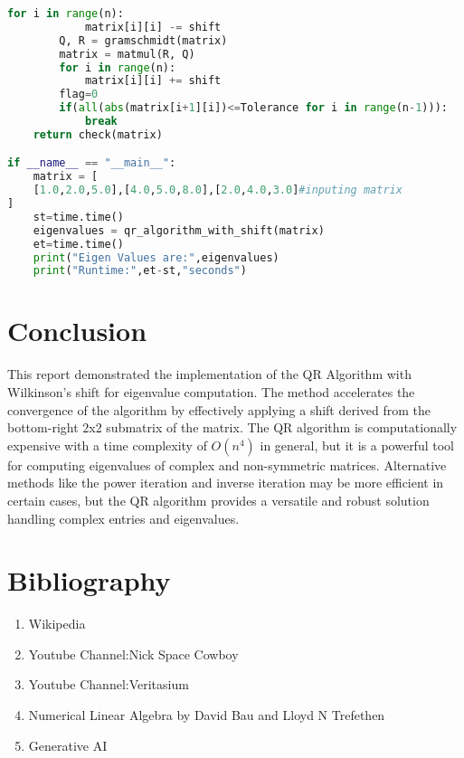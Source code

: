 \documentclass[journal]{IEEEtran}
\begin{document}
\begin{lstlisting}[language=Python, caption=QR Algorithm with Wilkinson's Shift in Python]
        for i in range(n):
            matrix[i][i] -= shift
        Q, R = gramschmidt(matrix)
        matrix = matmul(R, Q)
        for i in range(n):
            matrix[i][i] += shift
        flag=0
        if(all(abs(matrix[i+1][i])<=Tolerance for i in range(n-1))):
            break
    return check(matrix)

if __name__ == "__main__":
    matrix = [
    [1.0,2.0,5.0],[4.0,5.0,8.0],[2.0,4.0,3.0]#inputing matrix
]
    st=time.time()
    eigenvalues = qr_algorithm_with_shift(matrix)
    et=time.time()
    print("Eigen Values are:",eigenvalues)
    print("Runtime:",et-st,"seconds")


\end{lstlisting}

\section{Conclusion}
This report demonstrated the implementation of the QR Algorithm with Wilkinson's shift for eigenvalue computation. The method accelerates the convergence of the algorithm by effectively applying a shift derived from the bottom-right 2x2 submatrix of the matrix. The QR algorithm is computationally expensive with a time complexity of $O(n^4)$ in general, but it is a powerful tool for computing eigenvalues of complex and non-symmetric matrices. Alternative methods like the power iteration and inverse iteration may be more efficient in certain cases, but the QR algorithm provides a versatile and robust solution handling complex entries and eigenvalues.
\section{Bibliography}
\begin{enumerate}
    \item Wikipedia
    \item Youtube Channel:Nick Space Cowboy
    \item Youtube Channel:Veritasium
    \item Numerical Linear Algebra by David Bau and Lloyd N Trefethen
    \item Generative AI
\end{enumerate}
\end{document}
